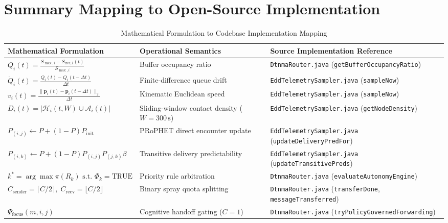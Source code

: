 \documentclass[journal,compsoc]{IEEEtran}
\begin{document}
\section{Summary Mapping to Open-Source Implementation}

\begin{table}[t]
\centering
\caption{Mathematical Formulation to Codebase Implementation Mapping}
\label{tab:mapping}
\begin{tabular}{lll}
\toprule
\textbf{Mathematical Formulation} & \textbf{Operational Semantics} & \textbf{Source Implementation Reference} \\
\midrule
$Q_i(t) = \frac{S_{\max, i} - S_{\mathrm{free}, i}(t)}{S_{\max, i}}$ & Buffer occupancy ratio & \texttt{DtnmaRouter.java} (\texttt{getBufferOccupancyRatio}) \\
$\dot{Q}_i(t) = \frac{Q_i(t) - Q_i(t-\Delta t)}{\Delta t}$ & Finite-difference queue drift & \texttt{EddTelemetrySampler.java} (\texttt{sampleNow}) \\
$v_i(t) = \frac{\|\mathbf{p}_i(t) - \mathbf{p}_i(t-\Delta t)\|_2}{\Delta t}$ & Kinematic Euclidean speed & \texttt{EddTelemetrySampler.java} (\texttt{sampleNow}) \\
$D_i(t) = |\mathcal{H}_i(t, W) \cup \mathcal{A}_i(t)|$ & Sliding-window contact density ($W=300\,\mathrm{s}$) & \texttt{EddTelemetrySampler.java} (\texttt{getNodeDensity}) \\
$P_{(i, j)} \leftarrow P + (1 - P)P_{\mathrm{init}}$ & PRoPHET direct encounter update & \texttt{EddTelemetrySampler.java} (\texttt{updateDeliveryPredFor}) \\
$P_{(i, k)} \leftarrow P + (1 - P)P_{(i, j)}P_{(j, k)}\beta$ & Transitive delivery predictability & \texttt{EddTelemetrySampler.java} (\texttt{updateTransitivePreds}) \\
$k^* = \arg\max \pi(R_k) \text{ s.t. } \Phi_k = \mathrm{TRUE}$ & Priority rule arbitration & \texttt{DtnmaRouter.java} (\texttt{evaluateAutonomyEngine}) \\
$C_{\mathrm{sender}} = \lceil C/2 \rceil, \; C_{\mathrm{recv}} = \lfloor C/2 \rfloor$ & Binary spray quota splitting & \texttt{DtnmaRouter.java} (\texttt{transferDone}, \texttt{messageTransferred}) \\
$\Psi_{\mathrm{focus}}(m, i, j)$ & Cognitive handoff gating ($C=1$) & \texttt{DtnmaRouter.java} (\texttt{tryPolicyGovernedForwarding}) \\

\end{tabular}
\end{table}
\end{document}
